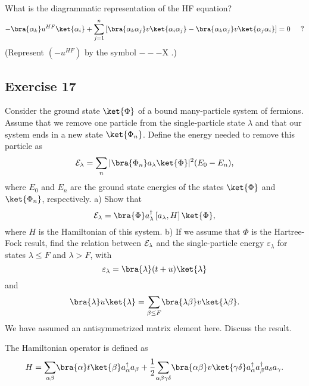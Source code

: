 \begin{prob}
What is the diagrammatic representation of the HF equation?
\[
-\bra{\alpha_{k}}u^{HF}\ket{\alpha_{i}}+\sum_{j=1}^{n}
\left[\bra{\alpha_{k}\alpha_{j}}v\ket{\alpha_{i}\alpha_{j}}-
\bra{\alpha_{k}\alpha_{j}}v\ket{\alpha_{j}\alpha_{i}}\right]=0
\hspace{0.5cm}?
\]
(Represent $(-u^{HF})$ by the symbol $---$X .)
\end{prob}
\begin{prob}
\subsection*{Exercise 17}

Consider the ground state $\ket{\Phi}$ 
of a bound many-particle system of fermions. Assume that we remove one particle
from the single-particle state $\lambda$ and that our system ends in a new state
$\ket{\Phi_{n}}$. 
Define the energy needed to remove this particle as
\[
{\cal E}_{\lambda}=\sum_{n}\vert
\bra{\Phi_{n}}a_{\lambda}\ket{\Phi}\vert^{2}(E_{0}-E_{n}),
\]
where $E_{0}$ and $E_{n}$  are the ground state energies of the states
$\ket{\Phi}$  and  $\ket{\Phi_{n}}$, respectively.
\newline
a) Show that
\[
{\cal E}_{\lambda}=\bra{\Phi}a_{\lambda}^{\dagger}\left[
a_{\lambda},H \right]\ket{\Phi},
\]
where $H$ is the Hamiltonian of this system.
\newline
b) If we assume that $\Phi$ is the  Hartree-Fock result, find the 
relation
between $\cal{E}_{\lambda}$ and the single-particle energy
$\varepsilon_{\lambda}$
for states $\lambda \leq F$ and $\lambda >F$, with
\[
\varepsilon_{\lambda}=\bra{\lambda}(t+u)\ket{\lambda}
\]
and
\[
\bra{\lambda}u\ket{\lambda}={\displaystyle \sum_{\beta \leq F}}
\bra{\lambda\beta}v\ket{\lambda\beta}.
\]
We have assumed an antisymmetrized matrix element here.
Discuss the result.

The Hamiltonian operator is defined as
\[
H={\displaystyle
\sum_{\alpha\beta}}\bra{\alpha}t\ket{\beta}a_{\alpha}^
{\dagger}a_{\beta}+
\frac{1}{2}{\displaystyle
\sum_{\alpha\beta\gamma\delta}}\bra{\alpha\beta}
v\ket{\gamma\delta}a_{\alpha}^{\dagger}a_{\beta}^{\dagger}
a_{\delta}a_{\gamma}.
\]
\end{prob}
